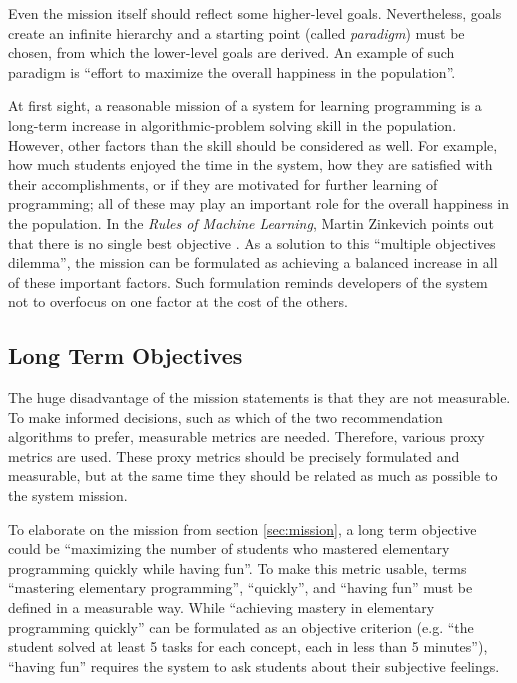 Even the mission itself should reflect some higher-level goals.
Nevertheless, goals create an infinite hierarchy
  and a starting point (called \emph{paradigm}) must be chosen,
  from which the lower-level goals are derived.
An example of such paradigm is
  ``effort to maximize the overall happiness in the population''.

At first sight, a reasonable mission of a system for learning programming
  is a long-term increase in algorithmic-problem solving skill in the population.
However, other factors than the skill should be considered as well.
For example, how much students enjoyed the time in the system,
  how they are satisfied with their accomplishments,
  or if they are motivated for further learning of programming;
  all of these may play an important role for the overall happiness in the population.
In the \emph{Rules of Machine Learning}, Martin Zinkevich
  points out that there is no single best objective \cite[][Rule \#39]{google-ml-rules}.
As a solution to this ``multiple objectives dilemma'',
  the mission can be formulated as achieving a balanced increase in all
  of these important factors.
Such formulation reminds developers of the system not to overfocus on one factor
  at the cost of the others.


\subsection{Long Term Objectives}
\label{sec:long-term-objectives}

The huge disadvantage of the mission statements
  is that they are not measurable.
To make informed decisions,
  such as which of the two recommendation algorithms to prefer,
  measurable metrics are needed.
Therefore, various proxy metrics are used.
These proxy metrics should be precisely formulated and measurable,
  but at the same time they should be related as much as possible to the system mission.

To elaborate on the mission from section \ref{sec:mission},
  a long term objective could be
  ``maximizing the number of students
  who mastered elementary programming quickly while having fun''.
To make this metric usable,
  terms ``mastering elementary programming'', ``quickly'', and ``having fun''
  must be defined in a measurable way.
While ``achieving mastery in elementary programming quickly'' can be
  formulated as an objective criterion
  (e.g. ``the student solved at least 5 tasks for each concept, each in less than 5 minutes''),
  ``having fun'' requires the system to ask students about their subjective feelings.

